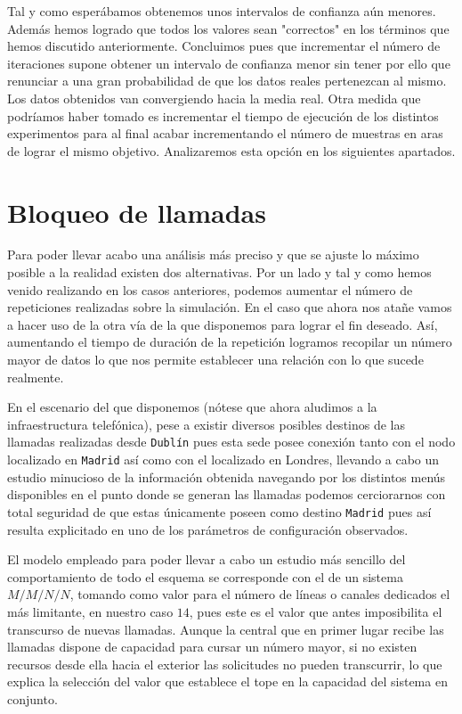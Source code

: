 \documentclass{article}[10pt]
\begin{document}
		Tal y como esperábamos obtenemos unos intervalos de confianza aún menores. Además hemos logrado que todos los valores sean "correctos" en los términos que hemos discutido anteriormente. Concluimos pues que incrementar el número de iteraciones supone obtener un intervalo de confianza menor sin tener por ello que renunciar a una gran probabilidad de que los datos reales pertenezcan al mismo. Los datos obtenidos van convergiendo hacia la media real. Otra medida que podríamos haber tomado es incrementar el tiempo de ejecución de los distintos experimentos para al final acabar incrementando el número de muestras en aras de lograr el mismo objetivo. Analizaremos esta opción en los siguientes apartados.

	\section{Bloqueo de llamadas}
		Para poder llevar acabo una análisis más preciso y que se ajuste lo máximo posible a la realidad existen dos alternativas. Por un lado y tal y como hemos venido realizando en los casos anteriores, podemos aumentar el número de repeticiones realizadas sobre la simulación. En el caso que ahora nos atañe vamos a hacer uso de la otra vía de la que disponemos para lograr el fin deseado. Así, aumentando el tiempo de duración de la repetición logramos recopilar un número mayor de datos lo que nos permite establecer una relación con lo que sucede realmente.

		En el escenario del que disponemos (nótese que ahora aludimos a la infraestructura telefónica), pese a existir diversos posibles destinos de las llamadas realizadas desde \texttt{Dublín} pues esta sede posee conexión tanto con el nodo localizado en \texttt{Madrid} así como con el localizado en Londres, llevando a cabo un estudio minucioso de la información obtenida navegando por los distintos menús disponibles en el punto donde se generan las llamadas podemos cerciorarnos con total seguridad de que estas únicamente poseen como destino \texttt{Madrid} pues así resulta explicitado en uno de los parámetros de configuración observados.

		El modelo empleado para poder llevar a cabo un estudio más sencillo del comportamiento de todo el esquema se corresponde con el de un sistema $M/M/N/N$, tomando como valor para el número de líneas o canales dedicados el más limitante, en nuestro caso $14$, pues este es el valor que antes imposibilita el transcurso de nuevas llamadas. Aunque la central que en primer lugar recibe las llamadas dispone de capacidad para cursar un número mayor, si no existen recursos desde ella hacia el exterior las solicitudes no pueden transcurrir, lo que explica la selección del valor que establece el tope en la capacidad del sistema en conjunto.
\end{document}
